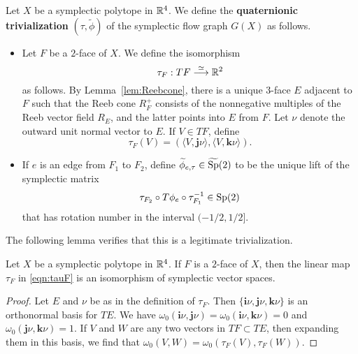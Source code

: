 \begin{definition}
\label{def:qtfg}
Let $X$ be a symplectic polytope in ${\mathbb R}^4$. We define the {\bf quaternionic trivialization\/} $(\tau,\widetilde{\phi})$ of the symplectic flow graph $G(X)$ as follows.
\begin{itemize}
  \item Let $F$ be a $2$-face of $X$. We define the isomorphism
  \[
\tau_F: TF \stackrel{\simeq}{\longrightarrow} {\mathbb R}^2
  \]
  as follows. By Lemma~\ref{lem:Reebcone}, there is a unique $3$-face $E$ adjacent to $F$ such that the Reeb cone $R_F^+$ consists of the nonnegative multiples of the Reeb vector field $R_E$, and the latter points into $E$ from $F$. Let $\nu$ denote the outward unit normal vector to $E$. If $V\in TF$, define
  \begin{equation}
  \label{eqn:tauF}
\tau_F(V) = (\langle V,{\mathbf j}\nu\rangle, \langle V,{\mathbf k}\nu\rangle).
  \end{equation}
  \item If $e$ is an edge from $F_1$ to $F_2$, define $\widetilde{\phi}_{e,\tau}\in\widetilde{\operatorname{Sp}}(2)$ to be the unique lift of the symplectic matrix
  \begin{equation}
  \label{eqn:transitionmap}
\tau_{F_2} \circ T\phi_e \circ \tau_{F_1}^{-1} \in \operatorname{Sp}(2)
  \end{equation}
  that has rotation number in the interval $(-1/2,1/2]$.
\end{itemize}
\end{definition}

The following lemma verifies that this is a legitimate trivialization.

\begin{lemma}
\label{lem:qtfg}
Let $X$ be a symplectic polytope in ${\mathbb R}^4$. If $F$ is a $2$-face of $X$, then the linear map $\tau_F$ in \eqref{eqn:tauF} is an isomorphism of symplectic vector spaces.
\end{lemma}

\begin{proof}
Let $E$ and $\nu$ be as in the definition of $\tau_F$. Then $\{{\mathbf i}\nu,{\mathbf j}\nu,{\mathbf k}\nu\}$ is an orthonormal basis for $TE$. We have $\omega_0({\mathbf i}\nu,{\mathbf j}\nu)=\omega_0({\mathbf i}\nu,{\mathbf k}\nu)=0$ and $\omega_0({\mathbf j}\nu,{\mathbf k}\nu)=1$. If $V$ and $W$ are any two vectors in $TF\subset TE$, then expanding them in this basis, we find that $\omega_0(V,W) = \omega_0(\tau_F(V),\tau_F(W))$.
\end{proof}


